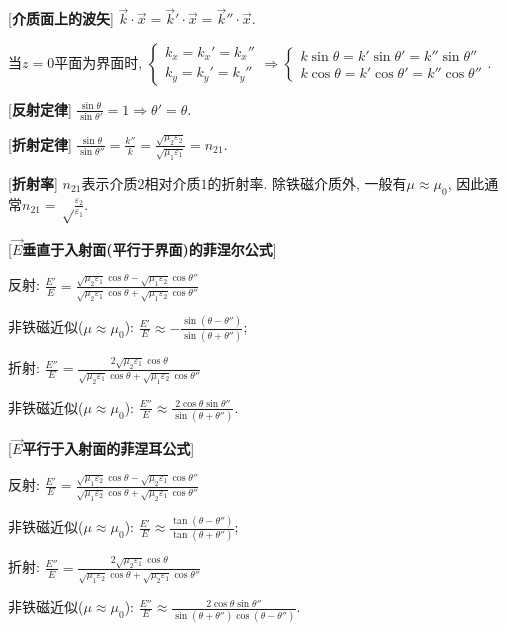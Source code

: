 [\textbf{介质面上的波矢}] $\vec k\cdot\vec x=\vec k'\cdot\vec x=\vec k''\cdot\vec x$.\par
\qquad 当$z=0$平面为界面时, $\begin{cases}k_x=k_x'=k_x''\\ k_y=k_y'=k_y''\end{cases}\Rightarrow \begin{cases}k\sin\theta=k'\sin{\theta'}=k''\sin{\theta''}\\ k\cos{\theta}=k'\cos{\theta'}=k''\cos{\theta''}\end{cases}$.\par

[\textbf{反射定律}] $\frac{\sin{\theta}}{\sin{\theta '}}=1\Rightarrow \theta'=\theta$.\par

[\textbf{折射定律}] $\frac{\sin\theta}{\sin\theta''}=\frac{k''}{k}=\frac{\sqrt{\mu_2\varepsilon_2}}{\sqrt{\mu_1\varepsilon_1}}=n_{21}$.\par

[\textbf{折射率}] $n_{21}$表示介质$2$相对介质$1$的折射率. 除铁磁介质外, 一般有$\mu\approx \mu_0$, 因此通常$n_{21}=\sqrt\frac{\varepsilon_2}{\varepsilon_1}$.\par

[\textbf{$\vec E$垂直于入射面(平行于界面)的菲涅尔公式}]\par
\qquad 反射: $\frac{E'}{E}=\frac{\sqrt{\mu_2\varepsilon_1}\cos\theta-\sqrt{\mu_1\varepsilon_2}\cos\theta''}{\sqrt{\mu_2\varepsilon_1}\cos\theta+\sqrt{\mu_1\varepsilon_2}\cos\theta''}$\par
\qquad \qquad 非铁磁近似($\mu\approx \mu_0$): $\frac{E'}{E}\approx -\frac{\sin{(\theta-\theta'')}}{\sin{(\theta+\theta'')}}$;\par
\qquad 折射: $\frac{E''}{E}=\frac{2\sqrt{\mu_2\varepsilon_1}\cos\theta}{\sqrt{\mu_2\varepsilon_1}\cos\theta+\sqrt{\mu_1\varepsilon_2}\cos\theta''}$\par
\qquad \qquad 非铁磁近似($\mu\approx \mu_0$): $\frac{E''}{E}\approx \frac{2\cos\theta\sin\theta''}{\sin{(\theta+\theta'')}}$.\par

[\textbf{$\vec E$平行于入射面的菲涅耳公式}]\par
\qquad 反射: $\frac{E'}{E}=\frac{\sqrt{\mu_1\varepsilon_2}\cos\theta-\sqrt{\mu_2\varepsilon_1}\cos\theta''}{\sqrt{\mu_1\varepsilon_2}\cos\theta+\sqrt{\mu_2\varepsilon_1}\cos\theta''}$\par
\qquad \qquad 非铁磁近似($\mu\approx \mu_0$): $\frac{E'}{E}\approx \frac{\tan{(\theta-\theta'')}}{\tan{(\theta+\theta'')}}$;\par
\qquad 折射: $\frac{E''}{E}=\frac{2\sqrt{\mu_2\varepsilon_1}\cos\theta}{\sqrt{\mu_1\varepsilon_2}\cos\theta+\sqrt{\mu_2\varepsilon_1}\cos\theta''}$\par
\qquad \qquad 非铁磁近似($\mu\approx \mu_0$): $\frac{E''}{E}\approx \frac{2\cos\theta\sin\theta''}{\sin{(\theta+\theta'')}\cos{(\theta-\theta'')}}$.\par

